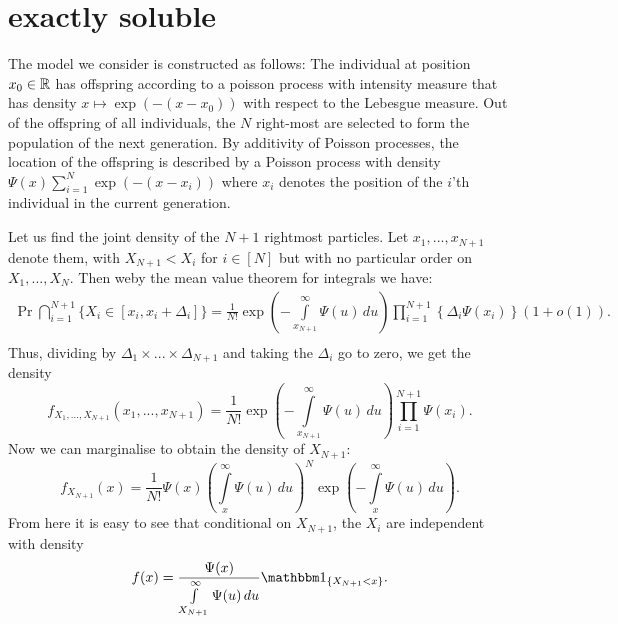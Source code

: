 \section{exactly soluble}
The model we consider is constructed as follows: The individual at position $x_0 \in \mathbb{R}$ has offspring according to a poisson process with intensity measure that has density $x \mapsto \exp(- (x - x_0))$ with respect to the Lebesgue measure. Out of the offspring of all individuals, the $N$ right-most are selected to form the population of the next generation. By additivity of Poisson processes, the location of the offspring is described by a Poisson process with density $\Psi(x) \sum\limits_{i = 1}^N \exp(-(x - x_i))$ where $x_i$ denotes the position of the $i$'th individual in the current generation. 


Let us find the joint density of the $N+1$ rightmost particles. Let $x_1, ..., x_{N+1}$ denote them, with $X_{N+1} < X_i$ for $i \in [N]$ but with no particular order on $X_1, ..., X_N$. Then weby the mean value theorem for integrals we have: \\
\begin{align*}
\Pr{\bigcap\limits_{i = 1}^{N+1} \{ X_i \in [x_i, x_i + \Delta_i] \}} = \frac{1}{N!} \exp\left(-\int\limits_{x_{N+1}}^\infty \Psi(u)\,du\right) \prod\limits_{i = 1}^{N+1}\left\{ \Delta_i \Psi(x_i) \right\} (1 + o(1)). \\
\end{align*}
Thus, dividing by $\Delta_1 \times ... \times \Delta_{N+1}$ and taking the $\Delta_i$ go to zero, we get the density
\begin{equation*}
f_{X_1, ..., X_{N+1}}(x_1, ..., x_{N+1}) = \frac{1}{N!} \exp\left(-\int\limits_{x_{N+1}}^\infty \Psi(u)\,du\right) \prod\limits_{i = 1}^{N+1} \Psi(x_i).
\end{equation*}
Now we can marginalise to obtain the density of $X_{N+1}$:
\begin{equation*}
f_{X_{N+1}}(x) = \frac{1}{N!} \Psi(x) \left(\int\limits_x^\infty \Psi(u)\,du\right)^N \exp\left(-\int\limits_x^\infty \Psi(u)\,du\right). 
\end{equation*}
From here it is easy to see that conditional on $X_{N+1}$, the $X_i$ are independent with density
\begin{equation*}
f(x) = \frac{\Psi(x)}{\int\limits_{X_{N+1}}^\infty \Psi(u)\, du} \Ind_{\{X_{N+1} < x\}}. 
\end{equation*}

